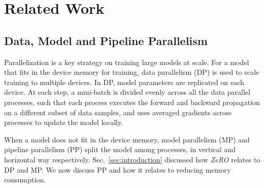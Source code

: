 \documentclass{article}
\newcommand{\name}{\emph{ZeRO}\xspace}
\begin{document}

\section{Related Work}
\label{sec:related-work}
\subsection{Data, Model and Pipeline Parallelism}
Parallelization is a key strategy on training large models at scale. For a model that fits in the device memory for training, data parallelism (DP) is used to scale training to multiple devices. In DP, model parameters are replicated on each device. At each step, a mini-batch is divided evenly across all the data parallel processes, such that each process executes the forward and backward propagation on a different subset of data samples, and uses averaged gradients across processes to update the model locally.  

When a model does not fit in the device memory, model parallelism (MP) \cite{DBLP:journals/corr/mesh-tensor, megatronlm} and pipeline parallelism (PP) \cite{GPipe, DBLP:journals/corr/pipedream} split the model among processes, in vertical and horizontal way respectively. Sec.~\ref{sec:introduction} discussed how \name relates to DP and MP. We now discuss PP and how it relates to reducing memory consumption.
\end{document}
